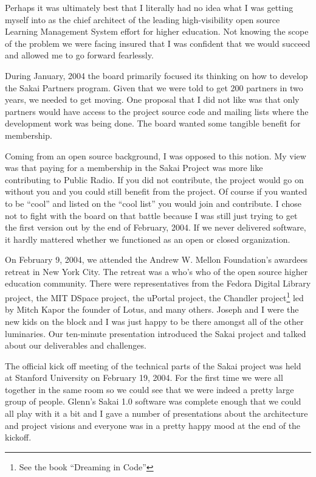 \documentclass[12pt]{book}
\begin{document}
Perhaps it was ultimately best that I literally had no idea what I was getting
myself into as the chief architect of the leading high-visibility open source
Learning Management System effort for higher education.  Not knowing the scope
of the problem we were facing insured that I was confident that we
would succeed and allowed me to go forward fearlessly.

During January, 2004 the board primarily focused its thinking on how to develop
the Sakai Partners program.  Given that we were told to get 200 partners in
two years, we needed to get moving.  One proposal that I did not like was that
only partners would have access to the project source code and mailing lists
where the development work was being done.  The board wanted some tangible benefit
for membership.

Coming from an open source background, I was opposed to this notion.
My view was that paying for a membership in the Sakai Project was more
like contributing to Public Radio.  If you did not contribute, the project would
go on without you and you could still benefit from the project.  Of course
if you wanted to be ``cool'' and listed on the ``cool list'' you would join and
contribute.  I chose not to fight with the board on that battle because I
was still just trying to get the first version out by the end of February,
2004.  If we never delivered software, it hardly mattered whether we functioned
as an open or closed organization.

On February 9, 2004, we attended the Andrew W. Mellon Foundation's awardees retreat
in New York City.   The retreat was a who's who of the open source
higher education community.  There were representatives from the Fedora Digital
Library project, the MIT DSpace project, the uPortal project, the Chandler
project\footnote{See the book ``Dreaming in Code''} led by Mitch Kapor the founder
of Lotus, and many others.  Joseph and I were the new kids on the block and I
was just happy to be there amongst all of the other luminaries.
Our ten-minute presentation introduced the Sakai project and talked about our deliverables
and challenges.

The official kick off meeting of the technical parts of the Sakai project was
held at Stanford University on February 19, 2004.  For the first time we were
all together in the same room so we could see that we were indeed a pretty
large group of people.  Glenn's Sakai 1.0 software was complete enough that we could
all play with it a bit and I gave a number of presentations about the architecture and
project visions and everyone was in a pretty happy mood at the end of the kickoff.
\end{document}
